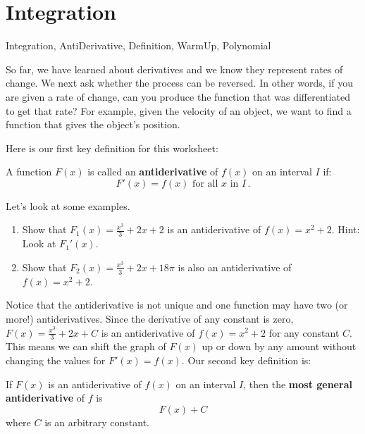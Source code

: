 
\section{Integration}



\begin{tagblock}{Integration, AntiDerivative, Definition, WarmUp, Polynomial}
\begin{question}

	So far, we have learned about derivatives and we know they represent rates of change. We next ask whether the process can be reversed. In other words, if you are given a rate of change, can you produce the function that was differentiated to get that rate? For example, given the velocity of an object, we want to find a function that gives the object's position.
\bigskip

 Here is our first key definition for this worksheet: \\
 \bigskip

A function $F(x)$ is called an \textbf{antiderivative} of $f(x)$ on an interval $I$ if:
$$F'(x) = f(x) \mbox{  for all  } x \mbox{  in  } I\,.$$


Let's look at some examples.


\begin{enumerate}
\item Show that $F_1(x) = \frac{x^3}{3} +2 x +2$ is an antiderivative of $f(x) = x^2 +2$. Hint: Look at $F_1'(x)$.
\vspace{1in}

\item Show that $F_2(x) = \frac{x^3}{3} +2 x +18\pi$ is also an antiderivative of $f(x) = x^2 +2$. 
\vspace{1in}
\end{enumerate}

Notice that the antiderivative is not unique and one function may have two (or more!) antiderivatives. Since the derivative of any constant is zero, $F(x) = \frac{x^3}{3} +2 x +C$ is an antiderivative of  $f(x) = x^2 +2$ for any constant $C$. This means we can shift the graph of $F(x)$ up or down by any amount without changing the values for $F'(x) = f(x)$.
\bigskip
Our second key definition is:\\
\bigskip

If $F(x)$ is an antiderivative of $f(x)$ on an interval $I$, then the \textbf{most general antiderivative} of $f$ is
$$F(x) + C$$
where $C$ is an arbitrary constant.
	

\end{question}
\end{tagblock}
